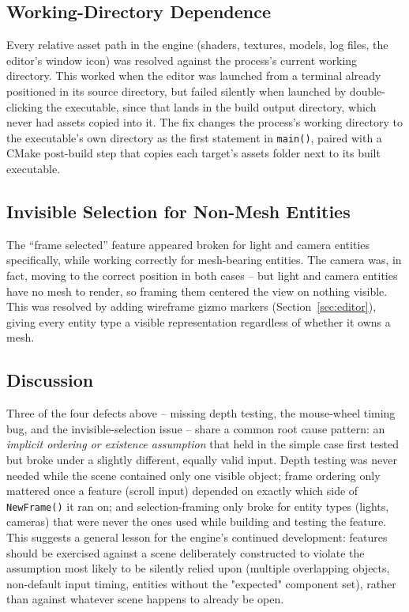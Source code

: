 \documentclass[conference]{IEEEtran}
\begin{document}
\subsection{Working-Directory Dependence}
Every relative asset path in the engine (shaders, textures, models, log
files, the editor's window icon) was resolved against the process's
current working directory. This worked when the editor was launched
from a terminal already positioned in its source directory, but failed
silently when launched by double-clicking the executable, since that
lands in the build output directory, which never had assets copied into
it. The fix changes the process's working directory to the executable's
own directory as the first statement in \texttt{main()}, paired with a
CMake post-build step that copies each target's assets folder next to
its built executable.

\subsection{Invisible Selection for Non-Mesh Entities}
The ``frame selected'' feature appeared broken for light and camera
entities specifically, while working correctly for mesh-bearing
entities. The camera was, in fact, moving to the correct position in
both cases -- but light and camera entities have no mesh to render, so
framing them centered the view on nothing visible. This was resolved by
adding wireframe gizmo markers (Section~\ref{sec:editor}), giving every
entity type a visible representation regardless of whether it owns a
mesh.

\subsection{Discussion}

Three of the four defects above -- missing depth testing, the
mouse-wheel timing bug, and the invisible-selection issue -- share a
common root cause pattern: an \emph{implicit ordering or existence
assumption} that held in the simple case first tested but broke under a
slightly different, equally valid input. Depth testing was never needed
while the scene contained only one visible object; frame ordering only
mattered once a feature (scroll input) depended on exactly which side of
\texttt{NewFrame()} it ran on; and selection-framing only broke for
entity types (lights, cameras) that were never the ones used while
building and testing the feature. This suggests a general lesson for the
engine's continued development: features should be exercised against a
scene deliberately constructed to violate the assumption most likely to
be silently relied upon (multiple overlapping objects, non-default input
timing, entities without the "expected" component set), rather than
against whatever scene happens to already be open.
\end{document}
